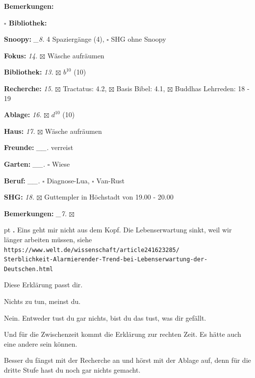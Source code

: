 \documentclass[10pt,a4paper]{article}
\newcounter{notec}
\newcommand\notep[1]{%
  \stepcounter{notec}
  \vskip #1pt
  {\bf\arabic{notec}.}
}
\newcommand\prop[1] {{\color {alizarin} {\bf #1}}}        %
\newcommand\mand[1] {{\color {burntorange} {\bf #1}}}     %
\newcommand\bottomspace{\vskip 4pt}
\newcommand\n[1] { {\sl #1.} \hskip 5pt }
\begin{document}
\begin{mdframed}[style=daystyle]
\begin{labeling}{{\mand {Bemerkungen:}}}
\begin{minipage}{0.75\textwidth}
\begin{labeling}{\prop {$\square$ {Bibliothek:}}}
      \end{labeling}
    \end{minipage}
    \bottomspace
  \item[{\mand {Snoopy:}}]        \n{\_8} 4 Spaziergänge (4), $\square$ SHG ohne Snoopy
  \item[{\mand {Fokus:}}]          \n{14} $\boxtimes$ Wäsche aufräumen
  \item[{\mand {Bibliothek:}}]     \n{13} $\boxtimes$ $b^{10}$ (10)
  \item[{\mand {Recherche:}}]      \n{15} $\boxtimes$ Tractatus: 4.2, $\boxtimes$ Basis Bibel: 4.1,
      $\boxtimes$ Buddhas Lehrreden: 18 - 19    
  \item[{\mand {Ablage:}}]         \n{16} $\boxtimes$ $d^{10}$ (10)
  \item[{\mand {Haus:}}]           \n{17} $\boxtimes$ Wäsche aufräumen
  \item[{\mand {Freunde:}}]      \n{\_\_} verreist
  \item[{\mand {Garten:}}]       \n{\_\_} $\square$ Wiese
  \item[{\mand {Beruf:}}]        \n{\_\_} $\square$ Diagnose-Lua, $\square$ Van-Rust
  \item[{\mand {SHG:}}]            \n{18} $\boxtimes$ Guttempler in Höchstadt von 19.00 - 20.00
  \item[{\mand {Bemerkungen:}}]   \n{\_7} $\boxtimes$
  \end{labeling}
    
  \setcounter{notec}{0}
  
  \notep 0 Eins geht mir nicht aus dem Kopf. Die Lebenserwartung sinkt, weil wir
  länger arbeiten müssen, siehe \\
  \verb+https://www.welt.de/wissenschaft/article241623285/+ \\
  \verb+Sterblichkeit-Alarmierender-Trend-bei-Lebenserwartung-der-Deutschen.html+

  \vskip 2pt
  Diese Erklärung passt dir.

  \vskip 2pt
  Nichts zu tun, meinst du.

  \vskip 2pt
  Nein. Entweder tust du gar nichts, bist du das tust, was dir gefällt.

  \vskip 2pt
  Und für die Zwischenzeit kommt die Erklärung zur rechten Zeit. Es hätte auch
  eine andere sein können.

  \vskip 2pt
  Besser du fängst mit der Recherche an und hörst mit der Ablage auf, denn für die
  dritte Stufe hast du noch gar nichts gemacht.



\end{mdframed}
\end{document}
